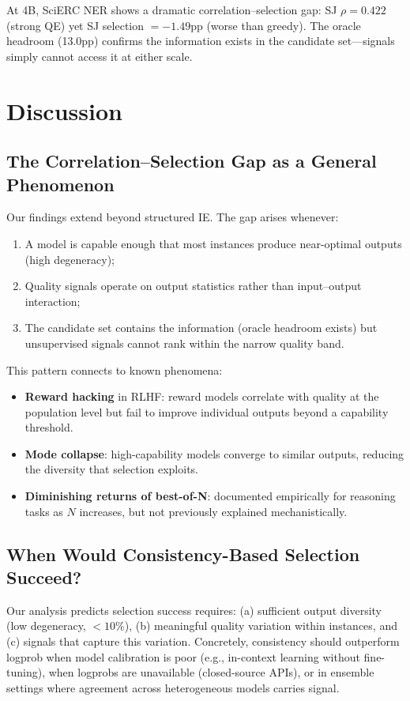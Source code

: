 \documentclass[11pt]{article}
\begin{document}
At 4B, SciERC NER shows a dramatic correlation--selection gap: SJ $\rho = 0.422$ (strong QE) yet SJ selection $= -1.49$pp (worse than greedy). The oracle headroom (13.0pp) confirms the information exists in the candidate set---signals simply cannot access it at either scale.

\section{Discussion}

\subsection{The Correlation--Selection Gap as a General Phenomenon}

Our findings extend beyond structured IE. The gap arises whenever:
\begin{enumerate}
\item A model is capable enough that most instances produce near-optimal outputs (high degeneracy);
\item Quality signals operate on output statistics rather than input--output interaction;
\item The candidate set contains the information (oracle headroom exists) but unsupervised signals cannot rank within the narrow quality band.
\end{enumerate}

This pattern connects to known phenomena:
\begin{itemize}
\item \textbf{Reward hacking} in RLHF: reward models correlate with quality at the population level but fail to improve individual outputs beyond a capability threshold.
\item \textbf{Mode collapse}: high-capability models converge to similar outputs, reducing the diversity that selection exploits.
\item \textbf{Diminishing returns of best-of-N}: documented empirically for reasoning tasks as $N$ increases, but not previously explained mechanistically.
\end{itemize}

\subsection{When Would Consistency-Based Selection Succeed?}

Our analysis predicts selection success requires: (a) sufficient output diversity (low degeneracy, $< 10\%$), (b) meaningful quality variation within instances, and (c) signals that capture this variation. Concretely, consistency should outperform logprob when model calibration is poor (e.g., in-context learning without fine-tuning), when logprobs are unavailable (closed-source APIs), or in ensemble settings where agreement across heterogeneous models carries signal.
\end{document}
